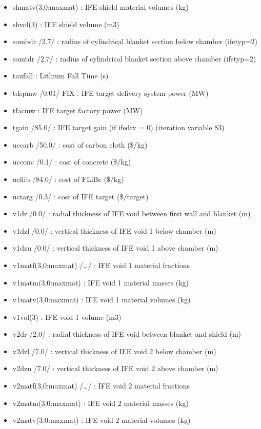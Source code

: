 \documentclass[]{article}
\begin{document}
\begin{itemize}
\item
  shmatv(3,0:maxmat) : IFE shield material volumes (kg)
\item
  shvol(3) : IFE shield volume (m3)
\item
  sombdr /2.7/ : radius of cylindrical blanket section below chamber
  (ifetyp=2)
\item
  somtdr /2.7/ : radius of cylindrical blanket section above chamber
  (ifetyp=2)
\item
  taufall : Lithium Fall Time (s)
\item
  tdspmw /0.01/ FIX : IFE target delivery system power (MW)
\item
  tfacmw : IFE target factory power (MW)
\item
  tgain /85.0/ : IFE target gain (if ifedrv = 0) (iteration variable 83)
\item
  uccarb /50.0/ : cost of carbon cloth (\$/kg)
\item
  ucconc /0.1/ : cost of concrete (\$/kg)
\item
  ucflib /84.0/ : cost of FLiBe (\$/kg)
\item
  uctarg /0.3/ : cost of IFE target (\$/target)
\item
  v1dr /0.0/ : radial thickness of IFE void between first wall and
  blanket (m)
\item
  v1dzl /0.0/ : vertical thickness of IFE void 1 below chamber (m)
\item
  v1dzu /0.0/ : vertical thickness of IFE void 1 above chamber (m)
\item
  v1matf(3,0:maxmat) /\ldots{}/ : IFE void 1 material fractions
\item
  v1matm(3,0:maxmat) : IFE void 1 material masses (kg)
\item
  v1matv(3,0:maxmat) : IFE void 1 material volumes (kg)
\item
  v1vol(3) : IFE void 1 volume (m3)
\item
  v2dr /2.0/ : radial thickness of IFE void between blanket and shield
  (m)
\item
  v2dzl /7.0/ : vertical thickness of IFE void 2 below chamber (m)
\item
  v2dzu /7.0/ : vertical thickness of IFE void 2 above chamber (m)
\item
  v2matf(3,0:maxmat) /\ldots{}/ : IFE void 2 material fractions
\item
  v2matm(3,0:maxmat) : IFE void 2 material masses (kg)
\item
  v2matv(3,0:maxmat) : IFE void 2 material volumes (kg)

\end{itemize}
\end{document}
